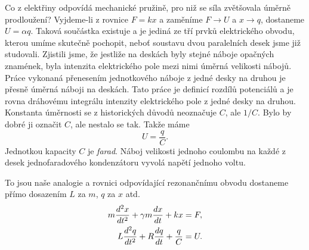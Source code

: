 {    Co z elektřiny odpovídá mechanické pružině, pro niž se síla zvětšovala úměrně prodloužení? 
    Vyjdeme-li z rovnice \(F=kx\) a zaměníme \(F \rightarrow U\) a \(x \rightarrow q\), dostaneme 
    \(U = \alpha q\). Taková součástka existuje a je jediná ze tří prvků elektrického obvodu, 
    kterou umíme skutečně pochopit, neboť soustavu dvou paralelních desek jsme již studovali. 
    Zjistili jsme, že jestliže na deskách byly stejné náboje opačných znamének, byla intenzita 
    elektrického pole mezi nimi úměrná velikosti nábojů. Práce vykonaná přenesením jednotkového 
    náboje z jedné desky na druhou je přesně úměrná náboji na deskách. Tato práce je definicí 
    rozdílů potenciálů a je rovna dráhovému integrálu intenzity elektrického pole z jedné desky na 
    druhou. Konstanta úměrnosti se z historických důvodů neoznačuje \(C\), ale \(1/C\). Bylo by 
    dobré ji označit \(C\), ale nestalo se tak. Takže máme
    \begin{equation}\label{fyz:eq350}
      U = \frac{q}{C}.
    \end{equation}
    Jednotkou kapacity \(C\) je \emph{farad}. Náboj velikosti jednoho coulombu na každé z desek 
    jednofaradového kondenzátoru vyvolá napětí jednoho voltu.
    
    To jsou naše analogie a rovnici odpovídající rezonančnímu obvodu dostaneme přímo dosazením 
    \(L\) za \(m\), \(q\) za \(x\) atd.
    \begin{subequations}\label{fyz:eq351}
      \begin{align}
        m\dfrac{d^2 x}{d t^2} + \gamma m\dfrac{d x}{d t} + kx   &= F,   \label{fyz:eq351a}   \\
        L\dfrac{d^2 q}{d t^2} + R\dfrac{d q}{d t} + \frac{q}{C} &= U.   \label{fyz:eq351b}
      \end{align}
    \end{subequations}
    
}
